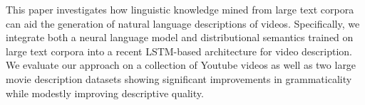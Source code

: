 This paper investigates how linguistic knowledge mined from large text corpora can aid the generation of natural language descriptions of videos. Specifically, we integrate both a neural language model and distributional semantics trained on large text corpora into a recent LSTM-based architecture for video description. We evaluate our approach on a collection of Youtube videos as well as two large movie description datasets showing significant improvements in grammaticality while modestly improving descriptive quality.
